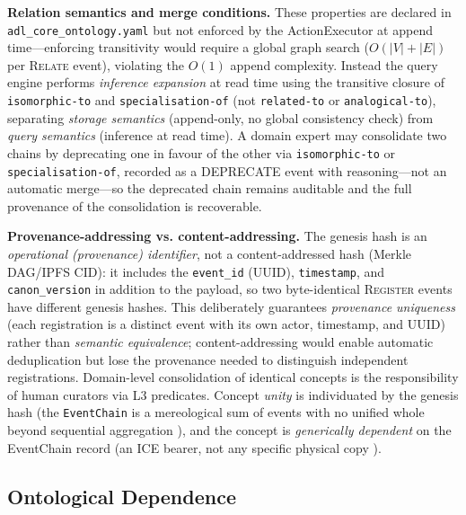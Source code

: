 \textbf{Relation semantics and merge conditions.} These properties are declared in \texttt{adl\_core\_ontology.yaml} but not enforced by the ActionExecutor at append time---enforcing transitivity would require a global graph search ($O(|V| + |E|)$ per \textsc{Relate} event), violating the $O(1)$ append complexity. Instead the query engine performs \emph{inference expansion} at read time using the transitive closure of \texttt{isomorphic-to} and \texttt{specialisation-of} (not \texttt{related-to} or \texttt{analogical-to}), separating \emph{storage semantics} (append-only, no global consistency check) from \emph{query semantics} (inference at read time). A domain expert may consolidate two chains by deprecating one in favour of the other via \texttt{isomorphic-to} or \texttt{specialisation-of}, recorded as a \textsc{DEPRECATE} event with reasoning---not an automatic merge---so the deprecated chain remains auditable and the full provenance of the consolidation is recoverable.

\textbf{Provenance-addressing vs. content-addressing.} The genesis hash is an \emph{operational (provenance) identifier}, not a content-addressed hash (Merkle DAG/IPFS CID): it includes the \texttt{event\_id} (UUID), \texttt{timestamp}, and \texttt{canon\_version} in addition to the payload, so two byte-identical \textsc{Register} events have different genesis hashes. This deliberately guarantees \emph{provenance uniqueness} (each registration is a distinct event with its own actor, timestamp, and UUID) rather than \emph{semantic equivalence}; content-addressing would enable automatic deduplication but lose the provenance needed to distinguish independent registrations. Domain-level consolidation of identical concepts is the responsibility of human curators via L3 predicates. Concept \emph{unity} is individuated by the genesis hash (the \texttt{EventChain} is a mereological sum of events with no unified whole beyond sequential aggregation \cite{ontoclean}), and the concept is \emph{generically dependent} on the EventChain record (an ICE bearer, not any specific physical copy \cite{bfo,fine1995ontologicaldependence}).

\subsection{Ontological Dependence}\label{subsec:ontological-dependence}

